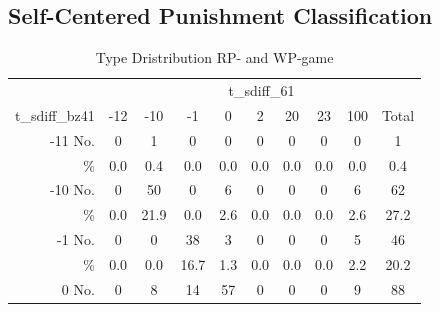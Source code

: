 \documentclass[11pt,a4paper]{article}
\newcommand{\mco}[2]{\multicolumn{#1}{c}{#2}}
\newcommand{\fns}{\footnotesize}
\begin{document}
\begin{refsection}
\subsection{Self-Centered Punishment Classification}
\begin{table}[htbp]
  \centering
  \caption{Type Dristribution RP- and WP-game}
  \begin{tabular}[h]{rccccccccc}
\toprule
               & \mco{9}{t\_sdiff\_61}                                                                                                                                                                                     \\
t\_sdiff\_bz41 & -12                   & -10                   & -1                    & 0                     & 2                     & 20                    & 23                    & 100                   & Total     \\
\midrule
-11 No.        & \color{gray} 0        & 1                     & \color{gray} 0        & \color{gray} 0        & \color{gray} 0        & \color{gray} 0        & \color{gray} 0        & \color{gray} 0        & 1         \\
\%             & \fns \color{gray} 0.0 & \fns 0.4              & \fns \color{gray} 0.0 & \fns \color{gray} 0.0 & \fns \color{gray} 0.0 & \fns \color{gray} 0.0 & \fns \color{gray} 0.0 & \fns \color{gray} 0.0 & \fns 0.4  \\
-10 No.        & \color{gray} 0        & 50                    & \color{gray} 0        & 6                     & \color{gray} 0        & \color{gray} 0        & \color{gray} 0        & 6                     & 62        \\
\%             & \fns \color{gray} 0.0 & \fns 21.9             & \fns \color{gray} 0.0 & \fns 2.6              & \fns \color{gray} 0.0 & \fns \color{gray} 0.0 & \fns \color{gray} 0.0 & \fns 2.6              & \fns 27.2 \\
-1 No.         & \color{gray} 0        & \color{gray} 0        & 38                    & 3                     & \color{gray} 0        & \color{gray} 0        & \color{gray} 0        & 5                     & 46        \\
\%             & \fns \color{gray} 0.0 & \fns \color{gray} 0.0 & \fns 16.7             & \fns 1.3              & \fns \color{gray} 0.0 & \fns \color{gray} 0.0 & \fns \color{gray} 0.0 & \fns 2.2              & \fns 20.2 \\
0 No.          & \color{gray} 0        & 8                     & 14                    & 57                    & \color{gray} 0        & \color{gray} 0        & \color{gray} 0        & 9                     & 88        \\

\end{tabular}
\end{table}
\end{refsection}
\end{document}
